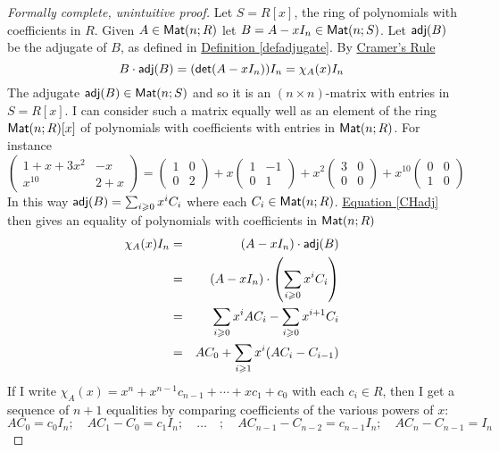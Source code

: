 \documentclass[11pt]{amsbook}
\theoremstyle{definition}
\begin{document}
\begin{proof}[Formally complete, unintuitive proof] Let $S = R[x]$, the ring of polynomials with coefficients in $R$. Given $A\in {\sf Mat}(n;R)$ let $B = A - xI_n \in {\sf Mat}(n; S)$. Let ${\sf adj}(B)$ be the adjugate of $B$, as defined in \hyperref[defadjugate]{Definition \ref{defadjugate}}. By \hyperref[Cramer]{Cramer's Rule} \begin{equation} \label{CHadj} B \cdot {\sf adj}(B) = ({\sf det}(A - xI_n))I_n = \chi_A(x) I_n\end{equation}
The adjugate ${\sf adj}(B)\in {\sf Mat}(n;S)$ and so it is an $(n\times n)$-matrix with entries in $S=R[x]$. I can consider such a matrix equally well as an element of the ring ${\sf Mat}(n;R)[x]$ of polynomials with coefficients with entries in ${\sf Mat}(n;R)$. For instance $$\begin{pmatrix} 1+ x + 3x^2 & - x \\ x^{10} &  2+x\end{pmatrix} =  \begin{pmatrix} 1 & 0 \\ 0 & 2 \end{pmatrix} + x\begin{pmatrix}  1 & -1 \\ 0 & 1 \end{pmatrix} + x^2 \begin{pmatrix} 3 & 0 \\ 0 & 0 \end{pmatrix} + x^{10}\begin{pmatrix} 0 & 0 \\ 1 & 0 \end{pmatrix} $$
In this way ${\sf adj}(B) = \sum_{i\geqslant 0} x^i C_i$ where each $C_i \in {\sf Mat}(n;R)$. \hyperref[CHadj]{Equation \eqref{CHadj}} then gives an equality of polynomials with coefficients in ${\sf Mat}(n;R)$ \begin{eqnarray*} \chi_A(x) I_n &=& (A - xI_n) \cdot {\sf adj}(B)  \\ & = & (A- xI_n) \cdot \left(\sum_{i\geqslant 0} x^i C_i\right) \\ & = & \sum_{i\geqslant 0} x^i AC_i - \sum_{i\geqslant 0} x^{i+1} C_i \\ & = & AC_0 + \sum_{i\geqslant 1} x^i(AC_i - C_{i-1})\end{eqnarray*}
If I write $\chi_A(x) = x^n + x^{n-1} c_{n-1} + \cdots + xc_1 + c_0$ with each $c_i\in R$, then I get  a sequence of $n+1$ equalities by comparing coefficients of the various powers of $x$:
$$ AC_0 = c_0I_n; \quad AC_1 - C_0 = c_1I_n; \quad \ldots \quad ; \quad AC_{n-1} - C_{n-2} = c_{n-1}I_n; \quad AC_{n} - C_{n-1} = I_n$$

\end{proof}
\end{document}
